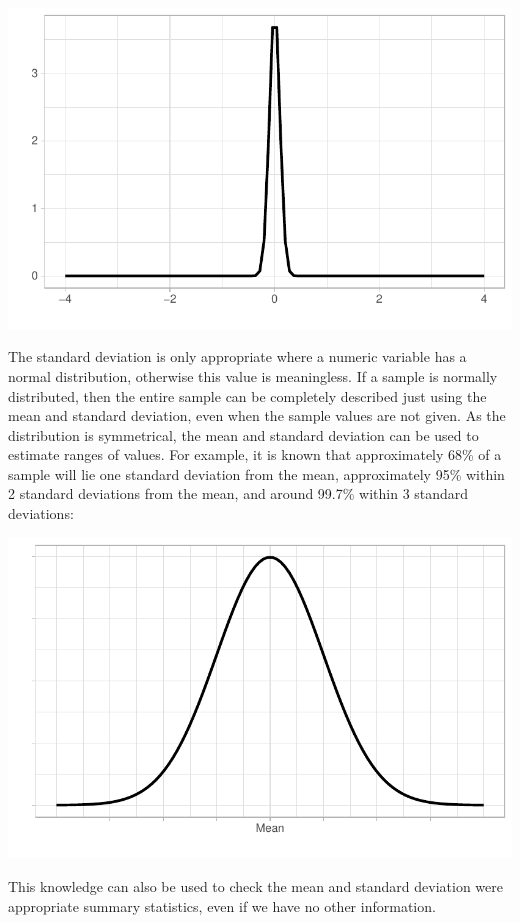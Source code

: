 \documentclass[
  letterpaper,
  DIV=11,
  numbers=noendperiod]{scrreprt}
\begin{document}
\includegraphics{combining_summarising_files/figure-pdf/normal distribution different sd-2.pdf}

The standard deviation is only appropriate where a numeric variable has
a normal distribution, otherwise this value is meaningless. If a sample
is normally distributed, then the entire sample can be completely
described just using the mean and standard deviation, even when the
sample values are not given. As the distribution is symmetrical, the
mean and standard deviation can be used to estimate ranges of values.
For example, it is known that approximately 68\% of a sample will lie
one standard deviation from the mean, approximately 95\% within 2
standard deviations from the mean, and around 99.7\% within 3 standard
deviations:

\includegraphics{combining_summarising_files/figure-pdf/normal with sd ranges-1.pdf}

This knowledge can also be used to check the mean and standard deviation
were appropriate summary statistics, even if we have no other
information.
\end{document}
